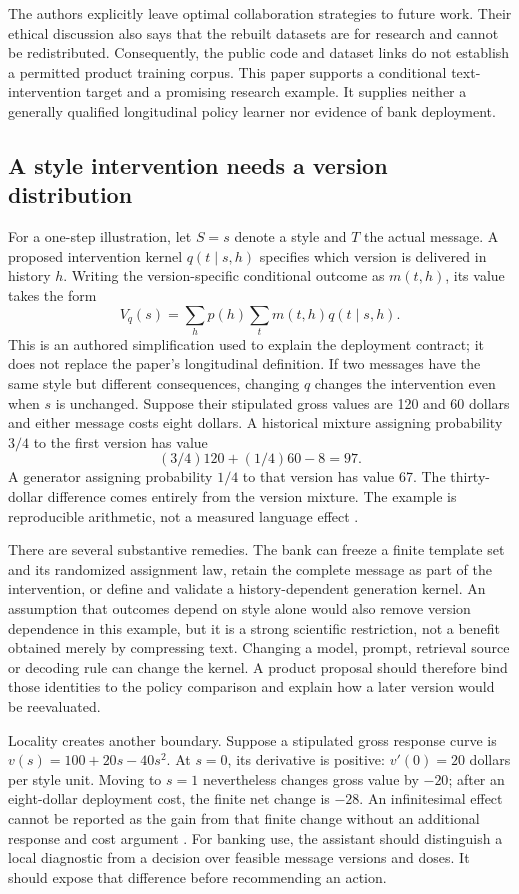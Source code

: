 The authors explicitly leave optimal collaboration strategies to future
work. Their ethical discussion also says that the rebuilt datasets are for
research and cannot be redistributed. Consequently, the public code and
dataset links do not establish a permitted product training corpus.
This paper supports a conditional text-intervention target and a promising
research example. It supplies neither a generally qualified longitudinal
policy learner nor evidence of bank deployment.

\subsection{A style intervention needs a version distribution}

For a one-step illustration, let $S=s$ denote a style and $T$ the actual
message. A proposed intervention kernel $q(t\mid s,h)$ specifies which
version is delivered in history $h$. Writing the version-specific
conditional outcome as $m(t,h)$, its value takes the form
\[
 V_q(s)=\sum_h p(h)\sum_t m(t,h)q(t\mid s,h).
\]
This is an authored simplification used to explain the deployment contract;
it does not replace the paper's longitudinal definition.
If two messages have the same style but different consequences,
changing $q$ changes the intervention even when $s$ is unchanged.
Suppose their stipulated gross values are 120 and 60 dollars and either
message costs eight dollars. A historical mixture assigning probability
$3/4$ to the first version has value
\[
 (3/4)120+(1/4)60-8=97.
\]
A generator assigning probability $1/4$ to that version has value 67.
The thirty-dollar difference comes entirely from the version mixture.
The example is reproducible arithmetic, not a measured language effect
\citep{exec16_longpolicy_oracle}.

There are several substantive remedies. The bank can freeze a finite
template set and its randomized assignment law, retain the complete
message as part of the intervention, or define and validate a
history-dependent generation kernel. An assumption that outcomes depend
on style alone would also remove version dependence in this example,
but it is a strong scientific restriction, not a benefit obtained merely
by compressing text. Changing a model, prompt, retrieval source or
decoding rule can change the kernel. A product proposal should therefore
bind those identities to the policy comparison and explain how a later
version would be reevaluated.

Locality creates another boundary. Suppose a stipulated gross response
curve is $v(s)=100+20s-40s^2$. At $s=0$, its derivative is positive:
$v'(0)=20$ dollars per style unit. Moving to $s=1$ nevertheless changes
gross value by $-20$; after an eight-dollar deployment cost, the finite
net change is $-28$.
An infinitesimal effect cannot be reported as the gain from that finite
change without an additional response and cost argument
\citep{exec16_longpolicy_oracle}. For banking use, the assistant should
distinguish a local diagnostic from a decision over feasible message
versions and doses. It should expose that difference before recommending
an action.

